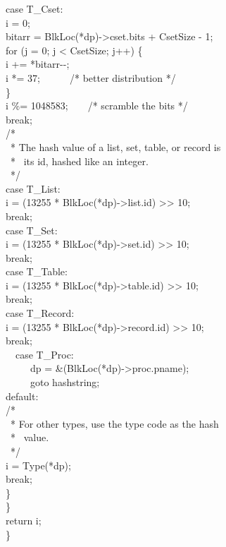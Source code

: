 {\>\>\>case T\_Cset:\\
\>\>\>\>i = 0;\\
\>\>\>\>bitarr = BlkLoc(*dp)->cset.bits + CsetSize - 1;\\
\>\>\>\>for (j = 0; j < CsetSize; j++) \{\\
\>\>\>\>\>i += *bitarr-{}-;\\
\>\>\>\>\>i *= 37;\ \ \ \ \ \ /* better distribution */\\
\>\>\>\>\>\}\\
\>\>\>\>i \%= 1048583;\ \ \ \ /* scramble the bits */\\
\>\>\>\>break;\\
\>\>\>/*\\
\>\>\>\ * The hash value of a list, set, table, or record is \\
\>\>\>\ * \ its id, hashed like an integer.\\
\>\>\>\ */\\
\>\>\>case T\_List:\\
\>\>\>\>i = (13255 * BlkLoc(*dp)->list.id) >> 10;\\
\>\>\>\>break;\\
\>\>\>case T\_Set:\\
\>\>\>\>i = (13255 * BlkLoc(*dp)->set.id) >> 10;\\
\>\>\>\>break;\\
\>\>\>case T\_Table:\\
\>\>\>\>i = (13255 * BlkLoc(*dp)->table.id) >> 10;\\
\>\>\>\>break;\\
\>\>\>case T\_Record:\\
\>\>\>\>i = (13255 * BlkLoc(*dp)->record.id) >> 10;\\
\>\>\>\>break;\\
\ \  case T\_Proc:\\
\ \  \ \ \ dp = \&(BlkLoc(*dp)->proc.pname);\\
\ \  \ \ \ goto hashstring;\\
\>\>\>default:\\
\>\>\>\>/*\\
\>\>\>\>\ * For other types, use the type code as the hash\\
\>\>\>\>\ * \ value.\\
\>\>\>\>\ */\\
\>\>\>\>i = Type(*dp);\\
\>\>\>\>break;\\
\>\>\>\}\\
\>\>\}\\
\>return i;\\
\>\}
}

